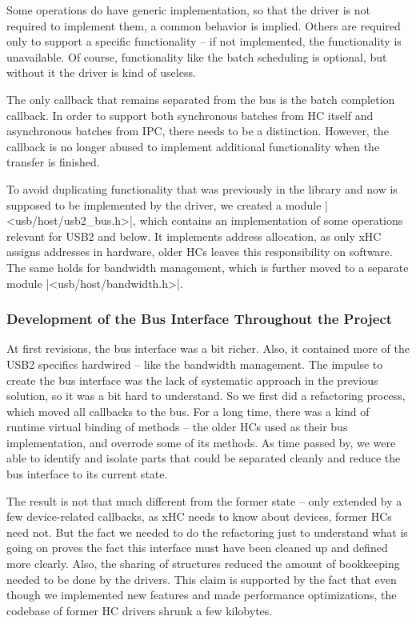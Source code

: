 Some operations do have generic implementation, so that the driver is not
required to implement them, a common behavior is implied. Others are required
only to support a specific functionality -- if not implemented, the
functionality is unavailable. Of course, functionality like the batch
scheduling is optional, but without it the driver is kind of useless.

The only callback that remains separated from the bus is the batch completion
callback. In order to support both synchronous batches from HC itself and
asynchronous batches from IPC, there needs to be a distinction. However, the
callback is no longer abused to implement additional functionality when the
transfer is finished.

To avoid duplicating functionality that was previously in the library and now is
supposed to be implemented by the driver, we created a module
\header|<usb/host/usb2_bus.h>|, which contains an implementation of some
operations relevant for USB2 and below. It implements address allocation, as
only xHC assigns addresses in hardware, older HCs leaves this responsibility on
software. The same holds for bandwidth management, which is further moved to
a separate module \header|<usb/host/bandwidth.h>|.

\subsubsection{Development of the Bus Interface Throughout the Project}

At first revisions, the bus interface was a bit richer. Also, it contained more
of the USB2 specifics hardwired -- like the bandwidth management. The impulse
to create the bus interface was the lack of systematic approach in the previous
solution, so it was a bit hard to understand. So we first did a refactoring
process, which moved all callbacks to the bus. For a long time, there was
a kind of runtime virtual binding of methods -- the older HCs used
 as their bus implementation, and overrode some of its
methods. As time passed by, we were able to identify and isolate parts that
could be separated cleanly and reduce the bus interface to its current state.

The result is not that much different from the former state -- only extended by
a few device-related callbacks, as xHC needs to know about devices, former HCs
need not. But the fact we needed to do the refactoring just to understand what
is going on proves the fact this interface must have been cleaned up and
defined more clearly. Also, the sharing of structures reduced the amount of
bookkeeping needed to be done by the drivers. This claim is supported by the
fact that even though we implemented new features and made performance
optimizations, the codebase of former HC drivers shrunk a few kilobytes.
